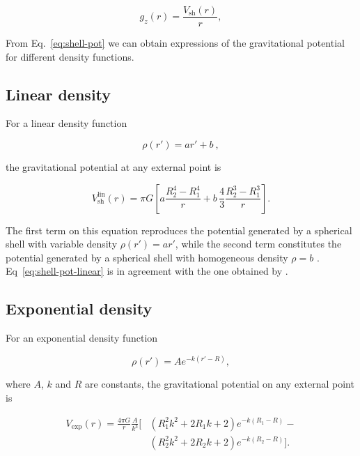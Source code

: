 \documentclass[extra, referee]{gji}
\begin{document}
\begin{equation}
    g_z(r) = \frac{V_\text{sh}(r)}{r},
\end{equation}

From Eq.~\ref{eq:shell-pot} we can obtain expressions of the gravitational potential for
different density functions.

\subsection{Linear density}

For a linear density function

\begin{equation}
    \rho(r') = ar' + b\ ,
\end{equation}

\noindent
the gravitational potential at any external point is

\begin{equation}
    V_\text{sh}^\text{lin}(r) = \pi G \left[
    a \frac{R_2^4 - R_1^4}{r} +
    b \,\frac{4}{3} \frac{R_2^3 - R_1^3}{r} \right].
    \label{eq:shell-pot-linear}
\end{equation}

\noindent The first term on this equation reproduces the potential generated
by a spherical shell with variable density $\rho(r') = ar'$, while the second
term constitutes the potential generated by a spherical shell with homogeneous
density $\rho = b$ \citep{Mikuska2006,Grombein2013}.
Eq~\ref{eq:shell-pot-linear} is in agreement with the one obtained by \citet{Lin2018}.

\subsection{Exponential density}

For an exponential density function

\begin{equation}
    \rho(r') = A e^{- k (r' - R)},
\end{equation}

\noindent
where $A$, $k$ and $R$ are constants, the gravitational potential on any external point
is

\begin{equation}
    \begin{split}
    V_\text{exp}(r) = \frac{4\pi G}{r} \frac{A}{k^3} \Big[
    & \left( R_1^2 k^2 + 2 R_1 k + 2 \right) e^{- k (R_1 - R)} - \\
    & \left( R_2^2 k^2 + 2 R_2 k + 2 \right) e^{- k (R_2 - R)}
    \Big].
    \end{split}
\end{equation}
\end{document}
